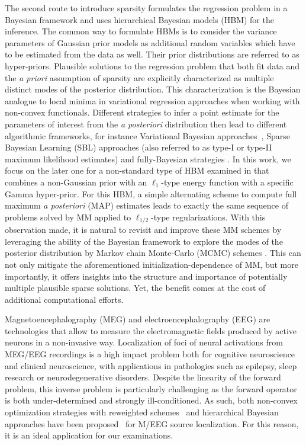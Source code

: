 The second route to introduce sparsity formulates the regression problem in a Bayesian framework and uses hierarchical Bayesian models (HBM) \cite{mackay2003information} for the inference.
The common way to formulate HBMs is to consider the variance parameters of Gaussian prior models as additional random variables which have to be estimated from the data as well. Their prior distributions are referred to as hyper-priors. Plausible solutions to the regression problem that both fit data and the \emph{a priori} assumption of sparsity are explicitly characterized as multiple distinct modes of the posterior distribution. This characterization is the Bayesian analogue to local minima in variational regression approaches when working with non-convex functionals. Different strategies to infer a point estimate for the parameters of interest from the \emph{a posteriori} distribution then lead to different algorithmic frameworks, for instance Variational Bayesian approaches~\cite{mackay2003information,jordan1999introduction,sato2004hierarchical,FrHaDaKiPhTrHeFlMa08,shervashidze2015learning}, Sparse Bayesian Learning (SBL) approaches (also referred to as type-I or type-II maximum likelihood estimates) \cite{tipping2001sparse,wipf2004sparse,Wipf-Nagarajan:2009,zhang-rao:2011} and fully-Bayesian strategies \cite{CaHaPuSo09,Lucka-etal:2012}.
In this work, we focus on the later one for a non-standard type of HBM examined in \cite{Lu14} that combines a non-Gaussian prior with an $\ell_{1}$-type energy function with a specific Gamma hyper-prior.
For this HBM, a simple alternating scheme to compute full maximum \emph{a posteriori} (MAP) estimates leads to exactly the same sequence of problems solved by MM applied to $\ell_{1/2}$-type regularizations.
With this observation made, it is natural to revisit and improve these MM schemes by leveraging the ability of the Bayesian framework to explore the modes of the posterior distribution by Markov chain Monte-Carlo (MCMC) schemes \cite{RoCa05,KaSo05}. This can not only mitigate the aforementioned initialization-dependence of MM, but more importantly, it offers insights into the structure and importance of potentially multiple plausible sparse solutions. Yet, the benefit comes at the cost of additional computational efforts.

Magnetoencephalography (MEG) and electroencephalography (EEG) are technologies that allow to measure the electromagnetic fields produced by active neurons in a non-invasive way. Localization of foci of neural activations from MEG/EEG recordings is a high impact problem both for cognitive neuroscience and clinical neuroscience, with applications in pathologies such as epilepsy, sleep research or neurodegenerative disorders. Despite the linearity of the forward problem, this inverse problem is
particularly challenging as the forward operator is both under-determined and strongly
ill-conditioned.
As such, both non-convex optimization strategies with reweighted schemes~\cite{strohmeier-etal:16} and hierarchical Bayesian approaches have been proposed~\cite{sato2004hierarchical,CaHaPuSo09,Wipf-Nagarajan:2009,Sorrentino-etal:2009,Lucka-etal:2012} for M/EEG source localization. For this reason, it is an ideal application for our examinations.\\


